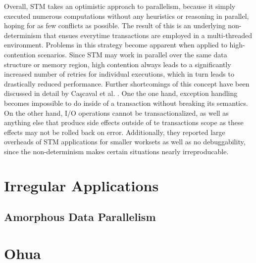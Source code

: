 Overall, STM takes an optimistic approach to parallelism, because it simply executed numerous computations without any heuristics or reasoning in parallel, hoping for as few conflicts as possible.
The result of this is an underlying non-determinism that ensues everytime transactions are employed in a multi-threaded environment.
Problems in this strategy become apparent when applied to high-contention scenarios.
Since STM may work in parallel over the same data structure or memory region, high contention always leads to a significantly increased number of retries for individual executions, which in turn leads to drastically reduced performance.
Further shortcomings of this concept have been discussed in detail by Caşcaval et al. \cite{cascaval2008software}.
One the one hand, exception handling becomes impossible to do inside of a transaction without breaking its semantics.
On the other hand, I/O operations cannot be transactionalized, as well as anything else that producs side effects outside of te transactions scope as these effects may not be rolled back on error.
Additionally, they reported large overheads of STM applications for smaller worksets as well as no debuggability, since the non-determinism makes certain situations nearly irreproducable.

\section{Irregular Applications}

\subsection{Amorphous Data Parallelism}




\section{Ohua}



